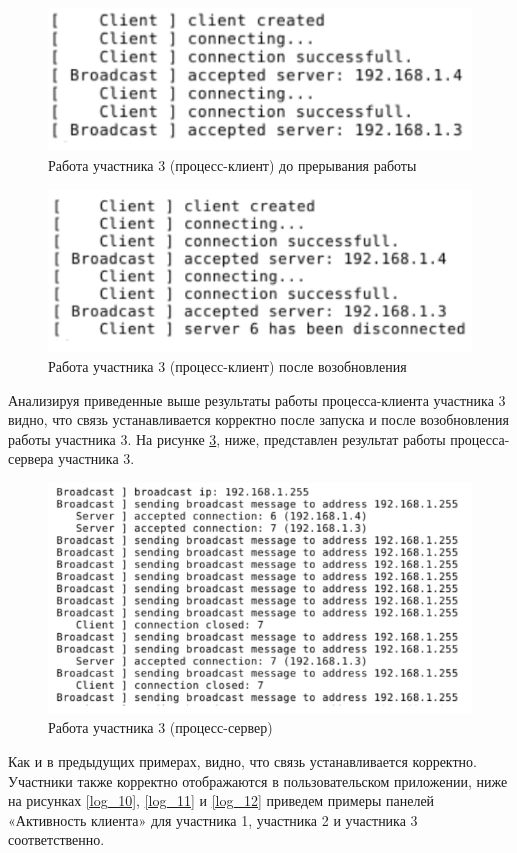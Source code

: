 \begin{figure}[!hbt]
    \centering
    \includegraphics{log_6}
    \caption{Работа участника 3 (процесс-клиент) до прерывания работы}\label{log_6}
\end{figure}
\begin{figure}[!hbt]
    \centering
    \includegraphics{log_7}
    \caption{Работа участника 3 (процесс-клиент) после возобновления}\label{log_7}
\end{figure}
\newpar
Анализируя приведенные выше результаты работы процесса-клиента
участника 3 видно, что связь устанавливается корректно после запуска и
после возобновления работы участника 3.
\newpar
На рисунке \ref{log_8}, ниже, представлен результат работы процесса-сервера
участника 3.

\begin{figure}[!hbt]
    \centering
    \includegraphics[width=\textwidth]{log_8}
    \caption{Работа участника 3 (процесс-сервер)}\label{log_8}
\end{figure}
\newpar
Как и в предыдущих примерах, видно, что связь устанавливается корректно.
Участники также корректно отображаются в пользовательском приложении,
ниже на рисунках \ref{log_10}, \ref{log_11} и \ref{log_12} приведем примеры панелей «Активность
клиента» для участника 1, участника 2 и участника 3 соответственно.

